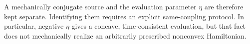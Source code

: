A mechanically conjugate source and the evaluation parameter $\eta$ are therefore kept separate. Identifying them requires an explicit same-coupling protocol. In particular, negative $\eta$ gives a concave, time-consistent evaluation, but that fact does not mechanically realize an arbitrarily prescribed nonconvex Hamiltonian.
\par
